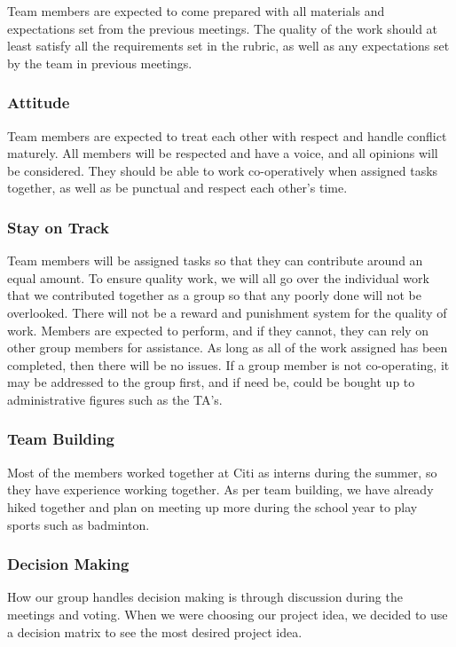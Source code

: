 \documentclass{article}
\begin{document}
Team members are expected to come prepared with all materials and expectations set from the previous meetings. The quality of the work should at least satisfy all the requirements set in the rubric, as well as any expectations set by the team in previous meetings. 

\subsubsection*{Attitude}

Team members are expected to treat each other with respect and handle conflict maturely. All members will be respected and have a voice, and all opinions will be considered. They should be able to work co-operatively when assigned tasks together, as well as be punctual and respect each other’s time. 

\subsubsection*{Stay on Track}

Team members will be assigned tasks so that they can contribute around an equal amount. To ensure quality work, we will all go over the individual work that we contributed together as a group so that any poorly done will not be overlooked. There will not be a reward and punishment system for the quality of work. Members are expected to perform, and if they cannot, they can rely on other group members for assistance. As long as all of the work assigned has been completed, then there will be no issues. If a group member is not co-operating, it may be addressed to the group first, and if need be, could be bought up to administrative figures such as the TA’s. 

\subsubsection*{Team Building}

Most of the members worked together at Citi as interns during the summer, so they have experience working together. As per team building, we have already hiked together and plan on meeting up more during the school year to play sports such as badminton. 

\subsubsection*{Decision Making} 

How our group handles decision making is through discussion during the meetings and voting. When we were choosing our project idea, we decided to use a decision matrix to see the most desired project idea. 
\end{document}
